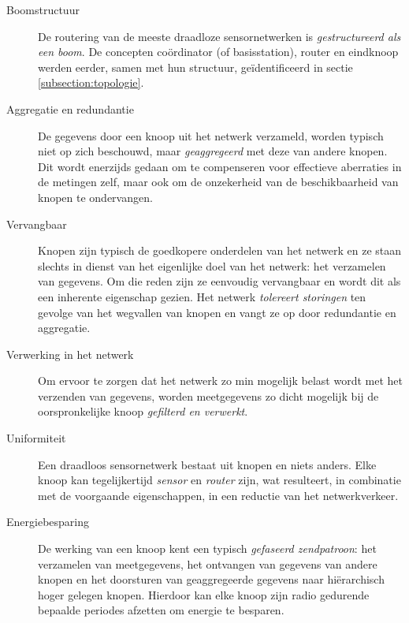 \begin{description}

  \item[Boomstructuur] De routering van de meeste draadloze sensornetwerken is
  \emph{gestructureerd als een boom}. De concepten co\"ordinator (of
  basisstation), router en eindknoop werden eerder, samen met hun structuur,
  ge\"identificeerd in sectie \ref{subsection:topologie}.

  \item[Aggregatie en redundantie] De gegevens door een knoop uit het netwerk
  verzameld, worden typisch niet op zich beschouwd, maar \emph{geaggregeerd}
  met deze van andere knopen. Dit wordt enerzijds gedaan om te compenseren voor
  effectieve aberraties in de metingen zelf, maar ook om de onzekerheid van de
  beschikbaarheid van knopen te ondervangen.

  \item[Vervangbaar] Knopen zijn typisch de goedkopere onderdelen van het
  netwerk en ze staan slechts in dienst van het eigenlijke doel van het
  netwerk: het verzamelen van gegevens. Om die reden zijn ze eenvoudig
  vervangbaar en wordt dit als een inherente eigenschap gezien. Het netwerk
  \emph{tolereert storingen} ten gevolge van het wegvallen van knopen en vangt
  ze op door redundantie en aggregatie.

  \item[Verwerking in het netwerk] Om ervoor te zorgen dat het netwerk zo min
  mogelijk belast wordt met het verzenden van gegevens, worden meetgegevens zo
  dicht mogelijk bij de oorspronkelijke knoop \emph{gefilterd en verwerkt}.

  \item[Uniformiteit] Een draadloos sensornetwerk bestaat uit knopen en niets
  anders. Elke knoop kan tegelijkertijd \emph{sensor} en \emph{router} zijn,
  wat resulteert, in combinatie met de voorgaande eigenschappen, in een
  reductie van het netwerkverkeer.

  \item[Energiebesparing] De werking van een knoop kent een typisch
  \emph{gefaseerd zendpatroon}: het verzamelen van meetgegevens, het ontvangen
  van gegevens van andere knopen en het doorsturen van geaggregeerde gegevens
  naar hi\"erarchisch hoger gelegen knopen. Hierdoor kan elke knoop zijn radio
  gedurende bepaalde periodes afzetten om energie te besparen.

\end{description}

